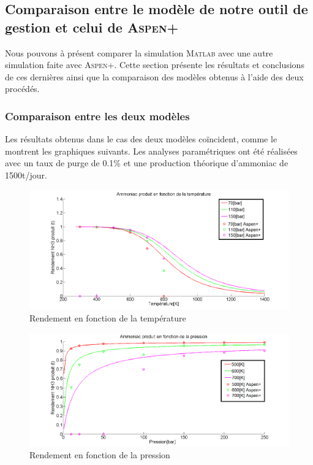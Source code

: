 
\subsection{Comparaison entre le modèle de notre outil de gestion et celui de \textsc{Aspen+}}
Nous pouvons à présent comparer la simulation \textsc{Matlab} avec une autre
simulation faite avec \textsc{Aspen+}. Cette section présente les résultats et conclusions de ces dernières ainsi que la comparaison des modèles obtenus à l'aide des deux procédés.
\subsubsection{Comparaison entre les deux modèles}
Les résultats obtenus dans le cas des deux modèles coïncident, comme le montrent les graphiques suivants. Les analyses paramétriques ont été réalisées avec un taux de purge de 0.1\% et une production théorique d'ammoniac de \unit{1500}{t/jour}.
\begin{figure}[ht!]
\centering
\includegraphics[scale=0.35]{GrapheCompT.png}
\caption{Rendement en fonction de la température}
\label{scheme1}
\end{figure}
\begin{figure}[ht!]
\centering
\includegraphics[scale=0.35]{GrapheCompP.png}
\caption{Rendement en fonction de la pression}
\label{scheme2}
\end{figure}
